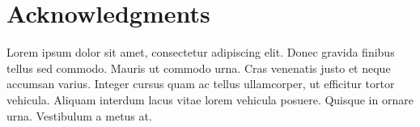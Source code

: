 
\section*{Acknowledgments}

Lorem ipsum dolor sit amet, consectetur adipiscing elit. Donec gravida finibus tellus sed commodo. Mauris ut commodo urna. Cras venenatis justo et neque accumsan varius. Integer cursus quam ac tellus ullamcorper, ut efficitur tortor vehicula. Aliquam interdum lacus vitae lorem vehicula posuere. Quisque in ornare urna. Vestibulum a metus at.

\endinput


